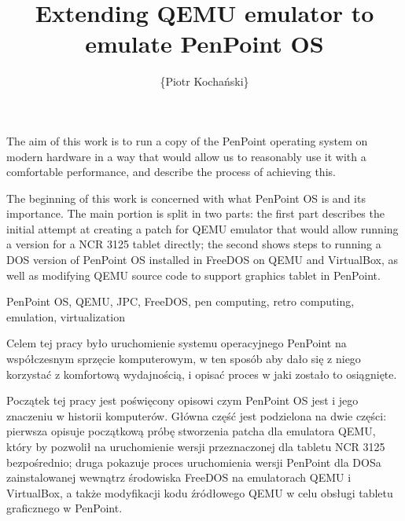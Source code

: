 \documentclass[
    bindingoffset=5mm,  %
    footnoteindent=3mm, %
    hyphenation=true    %
]{src/wut-thesis}
\begin{document}
\title{
    Extending QEMU emulator to emulate PenPoint OS
}

\author{\{Piotr Kochański\}}
\date{\the\year}
\maketitle

\cleardoublepage %

\abstract
The aim of this work is to run a copy of the PenPoint operating system on
modern hardware in a way that would allow us to reasonably use it with
a comfortable performance, and describe the process of achieving this.

The beginning of this work is concerned with what PenPoint OS is and its
importance. The main portion is split in two parts: the first part describes
the initial attempt at creating a patch for QEMU emulator that would allow
running a version for a NCR 3125 tablet directly; the second shows steps to
running a DOS version of PenPoint OS installed in FreeDOS on QEMU and
VirtualBox, as well as modifying QEMU source code to support graphics tablet in
PenPoint.

\keywords
PenPoint OS, QEMU, JPC, FreeDOS, pen computing, retro computing, emulation,
virtualization

\clearpage

\secondabstract
Celem tej pracy było uruchomienie systemu operacyjnego PenPoint na współczesnym
sprzęcie komputerowym, w ten sposób aby dało się z niego korzystać z komfortową
wydajnością, i opisać proces w jaki zostało to osiągnięte.

Początek tej pracy jest poświęcony opisowi czym PenPoint OS jest i jego znaczeniu
w historii komputerów.  Główna część jest podzielona na dwie części: pierwsza
opisuje początkową próbę stworzenia patcha dla emulatora QEMU, który by pozwolił
na uruchomienie wersji przeznaczonej dla tabletu NCR 3125 bezpośrednio; druga
pokazuje proces uruchomienia wersji PenPoint dla DOSa zainstalowanej wewnątrz
środowiska FreeDOS na emulatorach QEMU i VirtualBox, a także modyfikacji kodu
źródłowego QEMU w celu obsługi tabletu graficznego w PenPoint.
\end{document}
